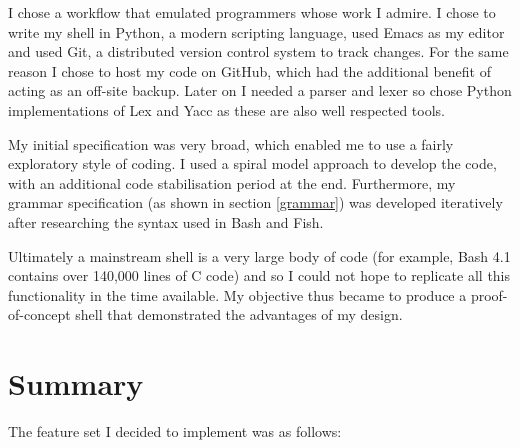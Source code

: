 \documentclass[12pt,twoside,notitlepage]{report}
\begin{document}
I chose a workflow that emulated programmers whose work I admire. I
chose to write my shell in Python, a modern scripting language, used
Emacs as my editor and used Git, a distributed version control system
to track changes. For the same reason I chose to host my code on GitHub,
which had the additional benefit of acting as an off-site
backup. Later on I needed a parser and lexer so chose Python
implementations of Lex and Yacc as these are also well respected tools.

My initial specification was very broad, which enabled me to use a
fairly exploratory style of coding. I used a spiral model approach to
develop the code, with an additional code stabilisation period at the
end. Furthermore, my grammar specification (as shown in section
\ref{grammar}) was developed iteratively after researching the syntax
used in Bash and Fish.

Ultimately a mainstream shell is a very large body of code (for
example, Bash 4.1 contains over 140,000 lines of C
code\footnotemark[1]) and so I could not hope to replicate all this
functionality in the time available. My objective thus became to
produce a proof-of-concept shell that demonstrated the advantages of
my design.


\section{Summary}

The feature set I decided to implement was as follows:
\end{document}
